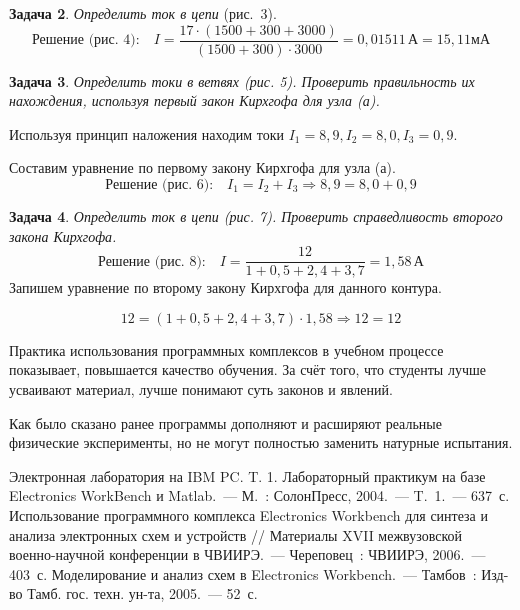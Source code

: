 \textbf{Задача 2}. \textit{Определить ток в цепи} (рис.~3).
\vspace{-6pt}
$$\text{Решение (рис.~4):}\quad I=\frac{17\cdot(1500+300+3000)}{(1500+300)\cdot3000}=0,01511\,\text{А}=15,11\text{мА}$$

\vspace{-16pt}


\textbf{Задача 3}. \textit{Определить токи в ветвях (рис. 5). Проверить правильность их нахождения, используя первый закон Кирхгофа для узла (а).}

Используя принцип наложения находим токи $I_1=8,9, I_2=8,0, I_3=0,9$.

Составим уравнение по первому закону Кирхгофа для узла (а).
\vspace{-8pt}
$$\text{Решение (рис. 6):}\quad I_1=I_2+I_3\Rightarrow8,9=8,0+0,9$$
\vspace{-8pt}

\clearpage

\textbf{Задача 4}. \textit{Определить ток в цепи (рис. 7). Проверить справедливость второго закона Кирхгофа.}
\vspace{-8pt}
$$\text{Решение (рис.~8):}\quad I=\frac{12}{1+0,5+2,4+3,7}=1,58\,\text{А}$$
\vspace{-12pt}
Запишем уравнение по второму закону Кирхгофа для данного контура.

$$12=(1+0,5+2,4+3,7)\cdot1,58\Rightarrow12=12$$
\vspace{-8pt}


Практика использования программных комплексов в учебном процессе показывает, повышается качество обучения. За счёт того, что студенты лучше усваивают материал, лучше понимают суть законов и явлений.

Как было сказано ранее программы дополняют и расширяют реальные физические эксперименты, но не могут полностью заменить натурные испытания.

\begin{thebibliography}{99}

\bibitem{} Электронная лаборатория на IBM PC. T. 1. Лабораторный практикум на базе Electronics WorkBench и Matlab.~--- М.~: СолонПресс, 2004.~--- T.~1.~--- 637~с.
\bibitem{} Использование программного комплекса Electronics Workbench для синтеза и анализа электронных схем и устройств // Материалы XVII межвузовской военно-научной конференции в ЧВИИРЭ.~--- Череповец~: ЧВИИРЭ, 2006.~--- 403~с.
\bibitem{} Моделирование и анализ схем в Electronics Workbench.~--- Тамбов~: Изд-во Тамб. гос. техн. ун-та, 2005.~--- 52~с.


\end{thebibliography}
